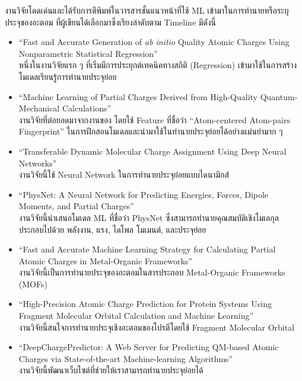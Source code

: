 งานวิจัยโดดเด่นและได้รับการตีพิมพ์ในวารสารชั้นแนวหน้าที่ใช้ ML เข้ามาในการทำนายหรือระบุประจุของอะตอม ที่ผู้เขียนได้เลือกมาซึ่งเรียงลำดับตาม 
Timeline มีดังนี้

\begin{itemize}
    \item \enquote{Fast and Accurate Generation of \textit{ab initio} Quality Atomic Charges Using Nonparametric 
    Statistical Regression}\autocite{rai2013} \\ 
    หนึ่งในงานวิจัยแรก ๆ ที่เริ่มมีการประยุกต์เทคนิคทางสถิติ (Regression) เข้ามาใช้ในการสร้างโมเดลเรียนรู้การทำนายประจุย่อย
    
    \item \enquote{Machine Learning of Partial Charges Derived from High-Quality Quantum-Mechanical Calculations} 
    \autocite{bleiziffer2018} \\
    งานวิจัยที่ต่อยอดมาจากงานของ โดยใช้ Feature ที่ชื่อว่า \enquote{Atom-centered Atom-pairs Fingerprint}\autocite{carhart1985} 
    ในการฝึกสอนโมเดลและนำมาใช้ในทำนายประจุย่อยได้อย่างแม่นยำมาก ๆ
    
    \item \enquote{Transferable Dynamic Molecular Charge Assignment Using Deep Neural Networks}\autocite{nebgen2018} \\
    งานวิจัยนี้ใช้ Neural Network ในการทำนายประจุย่อยแบบไดนามิกส์
    
    \item \enquote{PhysNet: A Neural Network for Predicting Energies, Forces, Dipole Moments, and Partial Charges}
    \autocite{unke2019} \\
    งานวิจัยนี้นำเสนอโมเดล ML ที่ชื่อว่า PhysNet ซึ่งสามารถทำนายคุณสมบัติเชิงโมเลกุล ประกอบไปด้วย พลังงาน, แรง, ไดโพล โมเมนต์, 
    และประจุย่อย
    
    \item \enquote{Fast and Accurate Machine Learning Strategy for Calculating Partial Atomic Charges in 
    Metal-Organic Frameworks}\autocite{kancharlapalli2021} \\ 
    งานวิจัยนี้เป็นการทำนายประจุของอะตอมในสารประกอบ Metal-Organic Frameworks (MOFs)
    
    \item \enquote{High-Precision Atomic Charge Prediction for Protein Systems Using Fragment Molecular Orbital 
    Calculation and Machine Learning}\autocite{kato2020} \\ 
    งานวิจัยนี้สนใจการทำนายประจุเชิงอะตอมของโปรตีโดยใช้ Fragment Molecular Orbital
    
    \item \enquote{DeepChargePredictor: A Web Server for Predicting QM-based Atomic Charges via State-of-the-art 
    Machine-learning Algorithms}\autocite{wang2021} \\ 
    งานวิจัยนี้พัฒนาเว็บไซต์ที่ช่วยให้เราสามารถทำนายประจุย่อยได้
\end{itemize}

